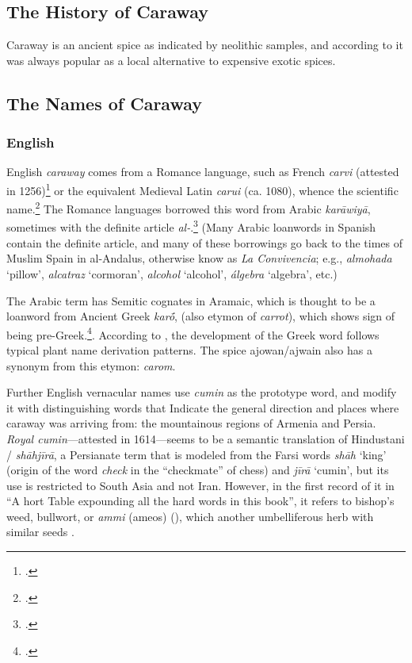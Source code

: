 \subsection{The History of Caraway}

Caraway is an ancient spice as indicated by neolithic samples, and according to \textcite[436]{kiple_cambridge_2000} it was always popular as a local alternative to expensive exotic spices.

\subsection{The Names of Caraway}

\subsubsection{English}



English \textit{caraway} comes from a Romance language, such as  French \textit{carvi} (attested in 1256)\footcite[carvi]{tlfi} or the equivalent Medieval Latin \textit{carui} (ca. 1080), whence the scientific name.\footcites[caraway]{oed}[carvi]{tlfi} The Romance languages borrowed this word from Arabic  \textit{karāwiyā}, sometimes with the definite article \textit{al-}.\footcite{corriente_dictionary_2008} (Many Arabic loanwords in Spanish contain the definite article, and many of these borrowings go back to the times of Muslim Spain in al-Andalus, otherwise know as \textit{La Convivencia}; e.g., \textit{almohada} `pillow', \textit{alcatraz} `cormoran', \textit{alcohol} `alcohol', \textit{álgebra} `algebra', etc.)

The Arabic term has Semitic cognates in Aramaic, which is thought to be a loanword from Ancient Greek  \textit{karṓ}, (also etymon of \textit{carrot}), which shows sign of being pre-Greek.\footcite{beekes_etymological_2010}. According to \textcite{sokoloff_dictionary_2002}, the development of the Greek word follows typical plant name derivation patterns. The spice ajowan/ajwain  also has a synonym from this etymon: \textit{carom}.

Further English vernacular names use \textit{cumin} as the prototype word, and modify it with distinguishing words that Indicate the general direction and places where caraway was arriving from: the mountainous regions of Armenia and Persia. \textit{Royal cumin}---attested in 1614---seems to be a semantic translation of Hindustani / \textit{shāhjīrā}, a Persianate term that is modeled from the Farsi words \textit{shāh}
`king' (origin of the word \textit{check} in the ``checkmate'' of chess) and \textit{jīrā} `cumin', but its use is restricted to South Asia and not Iran. However, in the first record of it in ``A \lgS hort Table expounding all the hard words in this book'', it refers to bishop's weed, bullwort, or \textit{ammi} (ameos) (), which another umbelliferous herb with similar seeds \autocite[]{markham_cheap_1614}.

